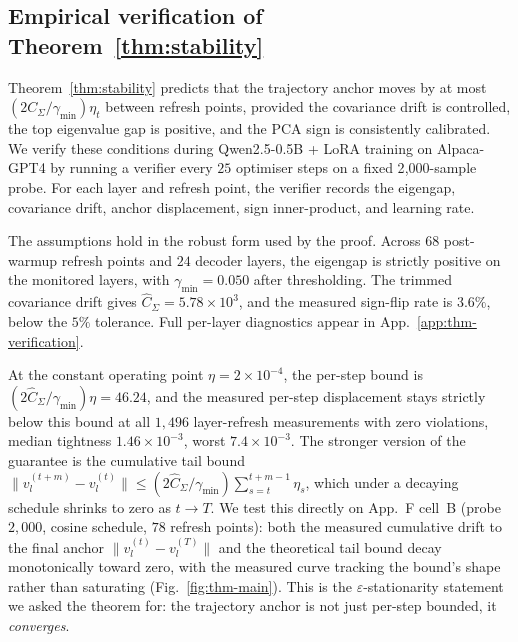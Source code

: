 \subsection{Empirical verification of Theorem~\ref{thm:stability}}
\label{sec:thm-empirical}

Theorem~\ref{thm:stability} predicts that the trajectory anchor
moves by at most $(2C_\Sigma/\gamma_{\min})\eta_t$ between refresh
points, provided the covariance drift is controlled, the top
eigenvalue gap is positive, and the PCA sign is consistently
calibrated. We verify these conditions during Qwen2.5-0.5B + LoRA
training on Alpaca-GPT4 by running a verifier every $25$ optimiser
steps on a fixed 2{,}000-sample probe. For each layer and refresh
point, the verifier records the eigengap, covariance drift, anchor
displacement, sign inner-product, and learning rate.

The assumptions hold in the robust form used by the proof. Across
$68$ post-warmup refresh points and $24$ decoder layers, the
eigengap is strictly positive on the monitored layers, with
$\gamma_{\min}=0.050$ after thresholding. The trimmed covariance
drift gives $\hat{C}_\Sigma=5.78\times 10^3$, and the measured
sign-flip rate is $3.6\%$, below the $5\%$ tolerance. Full
per-layer diagnostics appear in App.~\ref{app:thm-verification}.

At the constant operating point $\eta=2\times 10^{-4}$, the
per-step bound is $(2\hat{C}_\Sigma/\gamma_{\min}) \eta = 46.24$,
and the measured per-step displacement stays strictly below this
bound at all $1{,}496$ layer-refresh measurements with zero
violations, median tightness $1.46\times 10^{-3}$, worst
$7.4\times 10^{-3}$. The stronger version of the guarantee is the
cumulative tail bound
$\|v_l^{(t+m)} - v_l^{(t)}\| \le (2\hat{C}_\Sigma/\gamma_{\min})
\sum_{s=t}^{t+m-1} \eta_s$, which under a decaying schedule shrinks
to zero as $t \to T$. We test this directly on App.~F cell~B
(probe $2{,}000$, cosine schedule, $78$ refresh points): both the
measured cumulative drift to the final anchor
$\|v_l^{(t)} - v_l^{(T)}\|$ and the theoretical tail bound decay
monotonically toward zero, with the measured curve tracking the
bound's shape rather than saturating (Fig.~\ref{fig:thm-main}).
This is the $\varepsilon$-stationarity statement we asked the
theorem for: the trajectory anchor is not just per-step bounded, it
\emph{converges}.

